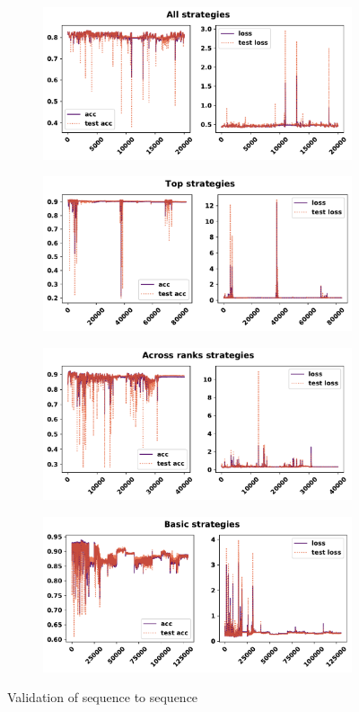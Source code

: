 \begin{figure}[!htbp]
    \begin{subfigure}{\textwidth}
    \centering
    \includegraphics[width=.8\textwidth]{src/chapters/07/img/validation_plot_all_strategies.pdf}
    \end{subfigure}\hfill
    \begin{subfigure}{\textwidth}
    \centering
    \includegraphics[width=.8\textwidth]{src/chapters/07/img/validation_plot_top_strategies.pdf}
    \end{subfigure}
    \begin{subfigure}{\textwidth}
    \centering
    \includegraphics[width=.8\textwidth]{src/chapters/07/img/validation_plot_across_ranks_strategies.pdf}
    \end{subfigure}
    \begin{subfigure}{\textwidth}
    \centering
    \includegraphics[width=.8\textwidth]{src/chapters/07/img/validation_plot_basic_strategies.pdf}
    \end{subfigure}
    \caption{Validation of sequence to sequence}\label{fig:validation_sequence_to_sequence}
\end{figure}

